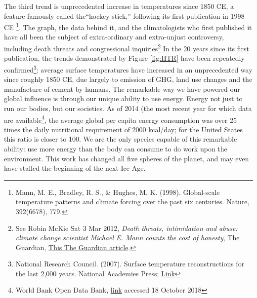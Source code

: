 The third trend is unprecedented increase in temperatures since 1850 CE, a feature famously called the``hockey stick,'' following its first publication in 1998 CE \footnote{Mann, M. E., Bradley, R. S., \& Hughes, M. K. (1998). Global-scale temperature patterns and climate forcing over the past six centuries. Nature, 392(6678), 779.}. The graph, the data behind it, and the climatologists who first published it have all been the subject of extra-ordinary and extra-unjust controversy, including death threats and congressional inquiries\footnote{See Robin McKie Sat 3 Mar 2012, \textit{Death threats, intimidation and abuse: climate change scientist Michael E. Mann counts the cost of honesty}, The Guardian, \href{https://www.theguardian.com/science/2012/mar/03/michael-mann-climate-change-deniers}{This The Guardian article}.} In the 20 years since its first publication, the trends demonstrated by Figure \ref{fig:HTR} have been repeatedly confirmed\footnote{National Research Council. (2007). Surface temperature reconstructions for the last 2,000 years. National Academies Press; \href{https://www.nap.edu/read/11676/chapter/1}{Link}}: average surface temperatures have increased in an unprecedented way since roughly 1850 CE, due largely to emission of GHG, land use changes and the manufacture of cement by humans. The remarkable way we have powered our global influence is through our unique ability to use energy. Energy not just to run our bodies, but our societies. As of 2014 (the most recent year for which data are available\footnote{World Bank Open Data Bank, \href{https://data.worldbank.org/indicator/EG.USE.PCAP.KG.OE}{link} accessed 18 October 2018}, the average global per capita energy consumption was over 25 times the daily nutritional requirement of 2000 kcal/day; for the United States this ratio is closer to 100. We are the only species capable of this remarkable ability: use more energy than the body can consume to do work upon the environment. This work has changed all five spheres of the planet, and may even have stalled the beginning of the next Ice Age.   \\

